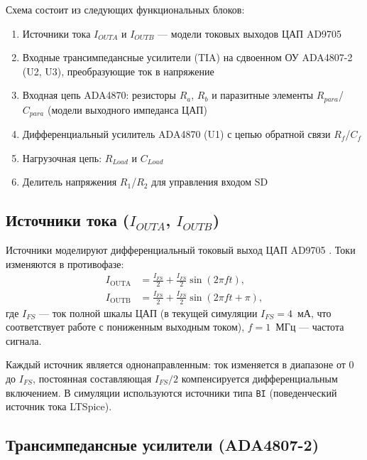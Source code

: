 \documentclass[a4paper, 12pt]{article}
\begin{document}
Схема состоит из следующих функциональных блоков:
\begin{enumerate}
  \item Источники тока \(I_{OUTA}\) и \(I_{OUTB}\) --- модели токовых выходов
        ЦАП AD9705
  \item Входные трансимпедансные усилители (TIA) на сдвоенном ОУ ADA4807-2
        (U2, U3), преобразующие ток в напряжение
  \item Входная цепь ADA4870: резисторы \(R_{a}\), \(R_{b}\) и паразитные элементы
        \(R_{para}\)/\(C_{para}\) (модели выходного импеданса ЦАП)
  \item Дифференциальный усилитель ADA4870 (U1) с цепью обратной
        связи \(R_f\)/\(C_f\)
  \item Нагрузочная цепь: \(R_{Load}\) и \(C_{Load}\)
  \item Делитель напряжения \(R_1\)/\(R_2\) для управления входом SD
\end{enumerate}

\subsection{Источники тока \texorpdfstring{(\(I_{OUTA}\), \(I_{OUTB}\))}{{(IOUTA, IOUTB)}}}

Источники моделируют дифференциальный токовый выход ЦАП AD9705
\cite{AD9705_ds}. Токи изменяются в противофазе:
\begin{align}
  I_{\text{OUTA}} &= \frac{I_{FS}}{2}
    + \frac{I_{FS}}{2}\sin(2\pi f t),
    \label{eq:iouta}\\
  I_{\text{OUTB}} &= \frac{I_{FS}}{2}
    + \frac{I_{FS}}{2}\sin(2\pi f t + \pi),
    \label{eq:ioutb}
\end{align}
где $I_{FS}$ --- ток полной шкалы ЦАП (в текущей симуляции $I_{FS}=4$~мА,
что соответствует работе с пониженным выходным током),
$f = 1$~МГц --- частота сигнала.

Каждый источник является однонаправленным: ток изменяется
в диапазоне от 0 до $I_{FS}$, постоянная составляющая
$I_{FS}/2$ компенсируется дифференциальным включением.
В симуляции используются источники типа \texttt{BI}
(поведенческий источник тока LTSpice).

\subsection{Трансимпедансные усилители (ADA4807-2)}
\end{document}
